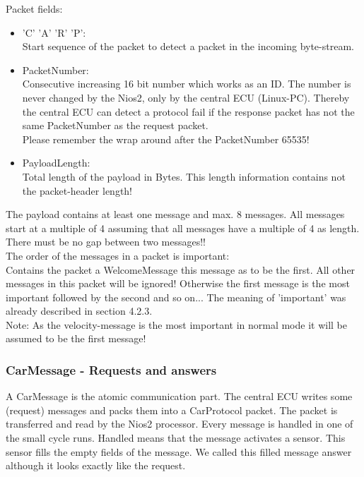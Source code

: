 Packet fields:
\begin{itemize}
\item 'C' 'A' 'R' 'P':\\
Start sequence of the packet to detect a packet in the  incoming byte-stream.
\item PacketNumber:\\
Consecutive increasing 16 bit number which works as an ID. The number is never changed by the Nios2, only by the central ECU (Linux-PC). Thereby the central ECU can detect a protocol fail if the response packet has not the same PacketNumber as the request packet.\\
Please remember the wrap around after the PacketNumber 65535!
\item PayloadLength:\\
Total length of the payload in Bytes. This length information contains not the packet-header length!
\end{itemize}

The payload contains at least one message and max. 8 messages. All messages start at a multiple of 4 assuming that all messages have a multiple of 4 as length. There must be no gap between two messages!!\\

The order of the messages in a packet is important:\\
Contains the packet a WelcomeMessage this message as to be the first. All other messages in this packet will be ignored! Otherwise the first message is the most important followed by the second and so on... The meaning of 'important' was already described in section 4.2.3.\\

Note: As the velocity-message is the most important in normal mode it will be assumed to be the first message!

\subsubsection{CarMessage - Requests and answers}

A CarMessage is the atomic communication part. The central ECU writes some (request) messages and packs them into a CarProtocol packet. The packet is transferred and read by the Nios2 processor. Every message is handled in one of the small cycle runs. Handled means that the message activates a sensor. This sensor fills the empty fields of the message. We called this filled message answer although it looks exactly like the request.\\

